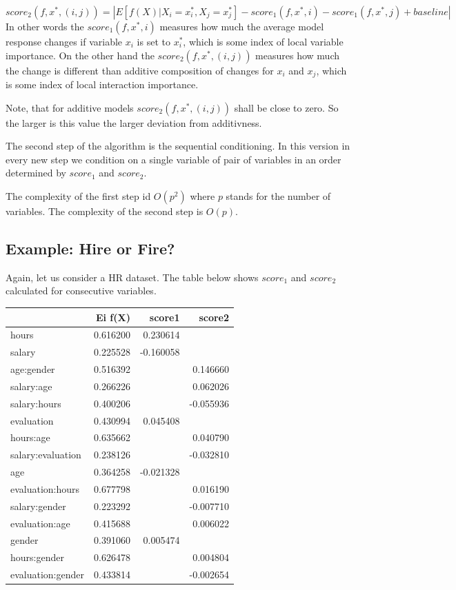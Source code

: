 \documentclass[]{krantz}
\theoremstyle{definition}
\theoremstyle{definition}
\theoremstyle{definition}
\theoremstyle{remark}
\begin{document}
\[
score_2(f, x^*, (i,j)) = \left| E [f(X)|X_i = x^*_i, X_j = x^*_j] - score_1 (f, x^*, i) - score_1 (f, x^*, j) + baseline \right|
\] In other words the \(score_1(f, x^*, i)\) measures how much the
average model response changes if variable \(x_i\) is set to \(x_i^*\),
which is some index of local variable importance. On the other hand the
\(score_2(f, x^*, (i,j))\) measures how much the change is different
than additive composition of changes for \(x_i\) and \(x_j\), which is
some index of local interaction importance.

Note, that for additive models \(score_2(f, x^*, (i,j))\) shall be close
to zero. So the larger is this value the larger deviation from
additivness.

The second step of the algorithm is the sequential conditioning. In this
version in every new step we condition on a single variable of pair of
variables in an order determined by \(score_1\) and \(score_2\).

The complexity of the first step id \(O(p^2)\) where \(p\) stands for
the number of variables. The complexity of the second step is \(O(p)\).

\hypertarget{example-hire-or-fire-1}{%
\subsection{Example: Hire or Fire?}\label{example-hire-or-fire-1}}

Again, let us consider a HR dataset. The table below shows \(score_1\)
and \(score_2\) calculated for consecutive variables.

\begin{longtable}[]{@{}lrrr@{}}
\toprule
& Ei f(X) & score1 & score2\tabularnewline
\midrule
\endhead
hours & 0.616200 & 0.230614 &\tabularnewline
salary & 0.225528 & -0.160058 &\tabularnewline
age:gender & 0.516392 & & 0.146660\tabularnewline
salary:age & 0.266226 & & 0.062026\tabularnewline
salary:hours & 0.400206 & & -0.055936\tabularnewline
evaluation & 0.430994 & 0.045408 &\tabularnewline
hours:age & 0.635662 & & 0.040790\tabularnewline
salary:evaluation & 0.238126 & & -0.032810\tabularnewline
age & 0.364258 & -0.021328 &\tabularnewline
evaluation:hours & 0.677798 & & 0.016190\tabularnewline
salary:gender & 0.223292 & & -0.007710\tabularnewline
evaluation:age & 0.415688 & & 0.006022\tabularnewline
gender & 0.391060 & 0.005474 &\tabularnewline
hours:gender & 0.626478 & & 0.004804\tabularnewline
evaluation:gender & 0.433814 & & -0.002654\tabularnewline
\bottomrule
\end{longtable}
\end{document}
